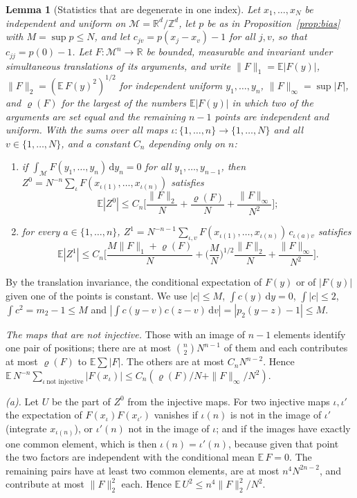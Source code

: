 \documentclass[11pt,a4paper]{article}
\makeatletter
\theoremstyle{stmt}
\newtheorem{lemma}[theorem]{Lemma}
\theoremstyle{defn}
\theoremstyle{rmk}
\renewenvironment{proof}[1][\proofname]{\par\pushQED{\qed}\normalfont\topsep6\p@\@plus6\p@\relax
  \trivlist\item[\hskip\labelsep{\sffamily\itshape\small #1.}]\ignorespaces}{\popQED\endtrivlist\@endpefalse}
\numberwithin{equation}{section}
\newcommand{\M}{\mathcal{M}}
\newcommand{\R}{\mathbb{R}}
\newcommand{\dd}{\mathrm{d}}
\makeatother
\begin{document}
{\begin{lemma}[Statistics that are degenerate in one index]\label{lem:degenerate}
Let $x_1,\dots,x_N$ be independent and uniform on $\M=\R^d/\mathbb Z^d$, let $p$ be as in Proposition~\ref{prop:bias} with $M=\sup p\le N$, and let $c_{jv}=p(x_j-x_v)-1$ for all $j,v$, so that $c_{jj}=p(0)-1$. Let $F\colon\M^n\to\R$ be bounded, measurable and invariant under simultaneous translations of its arguments, and write $\|F\|_1=\mathbb E|F(y)|$, $\|F\|_2=(\mathbb E\,F(y)^2)^{1/2}$ for independent uniform $y_1,\dots,y_n$, $\|F\|_\infty=\sup|F|$, and $\varrho(F)$ for the largest of the numbers $\mathbb E|F(y)|$ in which two of the arguments are set equal and the remaining $n-1$ points are independent and uniform. With the sums over all maps $\iota\colon\{1,\dots,n\}\to\{1,\dots,N\}$ and all $v\in\{1,\dots,N\}$, and a constant $C_n$ depending only on $n$:
\begin{enumerate}[label=\textup{(\alph*)}]
\item if $\int_\M F(y_1,\dots,y_n)\,\dd y_n=0$ for all $y_1,\dots,y_{n-1}$, then $Z^0=N^{-n}\sum_\iota F(x_{\iota(1)},\dots,x_{\iota(n)})$ satisfies
\[
\mathbb E|Z^0|\le C_n\Big[\frac{\|F\|_2}N+\frac{\varrho(F)}N+\frac{\|F\|_\infty}{N^2}\Big];
\]
\item for every $a\in\{1,\dots,n\}$, $Z^1=N^{-n-1}\sum_{\iota,v}F(x_{\iota(1)},\dots,x_{\iota(n)})\,c_{\iota(a)v}$ satisfies
\[
\mathbb E|Z^1|\le C_n\Big[\frac{M\|F\|_1+\varrho(F)}N+\Big(\frac MN\Big)^{1/2}\frac{\|F\|_2}N+\frac{\|F\|_\infty}{N^2}\Big].
\]
\end{enumerate}
\end{lemma}

\begin{proof}
By the translation invariance, the conditional expectation of $F(y)$ or of $|F(y)|$ given one of the points is constant. We use $|c|\le M$, $\int c(y)\,\dd y=0$, $\int|c|\le2$, $\int c^2=m_2-1\le M$ and $|\int c(y-v)c(z-v)\,\dd v|=|p_2(y-z)-1|\le M$.

\emph{The maps that are not injective.} Those with an image of $n-1$ elements identify one pair of positions; there are at most $\binom n2N^{n-1}$ of them and each contributes at most $\varrho(F)$ to $\mathbb E\sum|F|$. The others are at most $C_nN^{n-2}$. Hence $\mathbb E\,N^{-n}\sum_{\iota\ \text{not injective}}|F(x_\iota)|\le C_n(\varrho(F)/N+\|F\|_\infty/N^2)$.

\emph{(a).} Let $U$ be the part of $Z^0$ from the injective maps. For two injective maps $\iota,\iota'$ the expectation of $F(x_\iota)F(x_{\iota'})$ vanishes if $\iota(n)$ is not in the image of $\iota'$ (integrate $x_{\iota(n)}$), or $\iota'(n)$ not in the image of $\iota$; and if the images have exactly one common element, which is then $\iota(n)=\iota'(n)$, because given that point the two factors are independent with the conditional mean $\mathbb E\,F=0$. The remaining pairs have at least two common elements, are at most $n^4N^{2n-2}$, and contribute at most $\|F\|_2^2$ each. Hence $\mathbb E\,U^2\le n^4\|F\|_2^2/N^2$.


\end{proof}}
\end{document}
